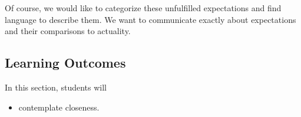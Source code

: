 \documentclass{ximera}
\begin{document}
Of course, we would like to categorize these unfulfilled expectations and find language to describe them. We want to communicate exactly about expectations and their comparisons to actuality.




\subsection{Learning Outcomes}


\begin{sectionOutcomes}
In this section, students will 

\begin{itemize}
\item contemplate closeness.
\end{itemize}
\end{sectionOutcomes}
\end{document}
